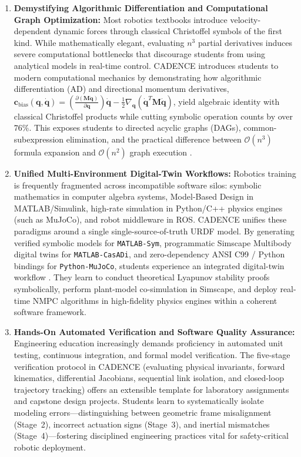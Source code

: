 \documentclass[fleqn,10pt]{article}
\begin{document}
\begin{enumerate}
	\item \textbf{Demystifying Algorithmic Differentiation and Computational Graph Optimization:} 
	Most robotics textbooks introduce velocity-dependent dynamic forces through classical Christoffel symbols of the first kind. While mathematically elegant, evaluating $n^3$ partial derivatives induces severe computational bottlenecks that discourage students from using analytical models in real-time control. CADENCE introduces students to modern computational mechanics by demonstrating how algorithmic differentiation (AD) and directional momentum derivatives, $\bm{c}_{\mathrm{bias}}(\bm{q},\dot{\bm{q}}) = \left(\frac{\partial (\bm{M}\dot{\bm{q}})}{\partial \bm{q}}\right)\dot{\bm{q}} - \frac{1}{2}\nabla_{\bm{q}}(\dot{\bm{q}}^T\bm{M}\dot{\bm{q}})$, yield algebraic identity with classical Christoffel products while cutting symbolic operation counts by over $76\%$. This exposes students to directed acyclic graphs (DAGs), common-subexpression elimination, and the practical difference between $\mathcal{O}(n^3)$ formula expansion and $\mathcal{O}(n^2)$ graph execution \cite{andersson2019casadi, carpentier2018analytical}.

	\item \textbf{Unified Multi-Environment Digital-Twin Workflows:} 
	Robotics training is frequently fragmented across incompatible software silos: symbolic mathematics in computer algebra systems, Model-Based Design in MATLAB/Simulink, high-rate simulation in Python/C++ physics engines (such as MuJoCo), and robot middleware in ROS. CADENCE unifies these paradigms around a single single-source-of-truth URDF model. By generating verified symbolic models for \texttt{MATLAB-Sym}, programmatic Simscape Multibody digital twins for \texttt{MATLAB-CasADi}, and zero-dependency ANSI C99 / Python bindings for \texttt{Python-MuJoCo}, students experience an integrated digital-twin workflow \cite{kritzinger2018digital, iliuta2024digital}. They learn to conduct theoretical Lyapunov stability proofs symbolically, perform plant-model co-simulation in Simscape, and deploy real-time NMPC algorithms \cite{verschueren2022acados, mastalli2020crocoddyl} in high-fidelity physics engines within a coherent software framework.

	\item \textbf{Hands-On Automated Verification and Software Quality Assurance:} 
	Engineering education increasingly demands proficiency in automated unit testing, continuous integration, and formal model verification. The five-stage verification protocol in CADENCE (evaluating physical invariants, forward kinematics, differential Jacobians, sequential link isolation, and closed-loop trajectory tracking) offers an extensible template for laboratory assignments and capstone design projects. Students learn to systematically isolate modeling errors---distinguishing between geometric frame misalignment (Stage~2), incorrect actuation signs (Stage~3), and inertial mismatches (Stage~4)---fostering disciplined engineering practices vital for safety-critical robotic deployment.
\end{enumerate}
\end{document}
